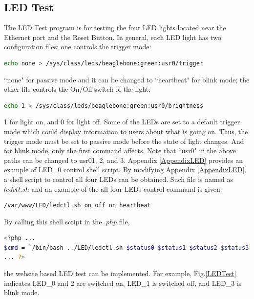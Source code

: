 \documentclass[12pt,journal,draftclsnofoot,onecolumn]{IEEEtran}
\begin{document}
\subsection{LED Test}\label{Led}
The LED Test program is for testing the four LED lights located near the Ethernet port and the Reset Button. In general, each LED light has two configuration files: one controls the trigger mode:
\begin{lstlisting}[language={bash}]
echo none > /sys/class/leds/beaglebone:green:usr0/trigger
\end{lstlisting}
``none" for passive mode and it can be changed to ``heartbeat" for blink mode; the other file controls the On/Off switch of the light:
\begin{lstlisting}[language={bash}]
echo 1 > /sys/class/leds/beaglebone:green:usr0/brightness
\end{lstlisting}
1 for light on, and 0 for light off. Some of the LEDs are set to a default trigger mode which could display information to users about what is going on. Thus, the trigger mode must be set to passive mode before the state of light changes. And for blink mode, only the first command affects. Note that ``usr0" in the above paths can be changed to usr01, 2, and 3. Appendix \ref{AppendixLED} provides an example of LED\_0 control shell script. By modifying Appendix \ref{AppendixLED}, a shell script to control all four LEDs can be obtained. Such file is named as $ledctl.sh$ and an example of the all-four LEDs control command is given:
\begin{lstlisting}[language={bash}]
/var/www/LED/ledctl.sh on off on heartbeat
\end{lstlisting}
By calling this shell script in the $.php$ file,
\begin{lstlisting}[language={bash}]
<?php ...
$cmd = `/bin/bash ../LED/ledctl.sh $status0 $status1 $status2 $status3`;
... ?>
\end{lstlisting}
the website based LED test can be implemented. For example, Fig.\ref{LEDTest} indicates LED\_0 and 2 are switched on, LED\_1 is switched off, and LED\_3 is blink mode.
\end{document}
